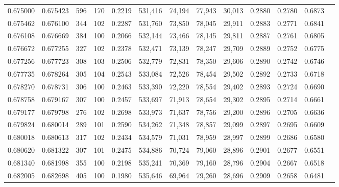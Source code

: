 \begin{tabular}{rrrrrrrrrrrrr}
0.675000 & 0.675423 &    596 &   170 &                                     0.2219 & 531,416 &  74,194 &  77,943 &  30,013 & 0.2880 & 0.2780 & 0.6873 \\
0.675462 & 0.676100 &    344 &   102 &                                     0.2287 & 531,760 &  73,850 &  78,045 &  29,911 & 0.2883 & 0.2771 & 0.6841 \\
0.676108 & 0.676669 &    384 &   100 &                                     0.2066 & 532,144 &  73,466 &  78,145 &  29,811 & 0.2887 & 0.2761 & 0.6805 \\
0.676672 & 0.677255 &    327 &   102 &                                     0.2378 & 532,471 &  73,139 &  78,247 &  29,709 & 0.2889 & 0.2752 & 0.6775 \\
0.677256 & 0.677723 &    308 &   103 &                                     0.2506 & 532,779 &  72,831 &  78,350 &  29,606 & 0.2890 & 0.2742 & 0.6746 \\
0.677735 & 0.678264 &    305 &   104 &                                     0.2543 & 533,084 &  72,526 &  78,454 &  29,502 & 0.2892 & 0.2733 & 0.6718 \\
0.678270 & 0.678731 &    306 &   100 &                                     0.2463 & 533,390 &  72,220 &  78,554 &  29,402 & 0.2893 & 0.2724 & 0.6690 \\
0.678758 & 0.679167 &    307 &   100 &                                     0.2457 & 533,697 &  71,913 &  78,654 &  29,302 & 0.2895 & 0.2714 & 0.6661 \\
0.679177 & 0.679798 &    276 &   102 &                                     0.2698 & 533,973 &  71,637 &  78,756 &  29,200 & 0.2896 & 0.2705 & 0.6636 \\
0.679824 & 0.680014 &    289 &   101 &                                     0.2590 & 534,262 &  71,348 &  78,857 &  29,099 & 0.2897 & 0.2695 & 0.6609 \\
0.680018 & 0.680613 &    317 &   102 &                                     0.2434 & 534,579 &  71,031 &  78,959 &  28,997 & 0.2899 & 0.2686 & 0.6580 \\
0.680620 & 0.681322 &    307 &   101 &                                     0.2475 & 534,886 &  70,724 &  79,060 &  28,896 & 0.2901 & 0.2677 & 0.6551 \\
0.681340 & 0.681998 &    355 &   100 &                                     0.2198 & 535,241 &  70,369 &  79,160 &  28,796 & 0.2904 & 0.2667 & 0.6518 \\
0.682005 & 0.682698 &    405 &   100 &                                     0.1980 & 535,646 &  69,964 &  79,260 &  28,696 & 0.2909 & 0.2658 & 0.6481 \\

\end{tabular}
